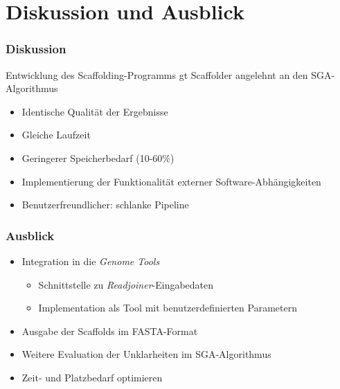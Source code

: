 \documentclass[xcolor=pst]{beamer}
\begin{document}
\section{Diskussion und Ausblick}
\begin{frame}
  \frametitle{Diskussion}
  Entwicklung des Scaffolding-Programms gt Scaffolder angelehnt an den SGA-Algorithmus
  \begin{itemize}
    \item Identische Qualität der Ergebnisse
    \item Gleiche Laufzeit
    \item Geringerer Speicherbedarf (10-60\%)
    \item Implementierung der Funktionalität externer Software-Abhängigkeiten
    \item Benutzerfreundlicher: schlanke Pipeline
  \end{itemize}
\end{frame}

\begin{frame}
  \frametitle{Ausblick}
  \begin{itemize}
    \item Integration in die \textit{Genome Tools}
    \begin{itemize}
      \item Schnittstelle zu \textit{Readjoiner}-Eingabedaten
      \item Implementation als Tool mit benutzerdefinierten Parametern
    \end{itemize}
    \item Ausgabe der Scaffolds im FASTA-Format
    \item Weitere Evaluation der Unklarheiten im SGA-Algorithmus
    \item Zeit- und Platzbedarf optimieren
  \end{itemize}
\end{frame}
\end{document}
